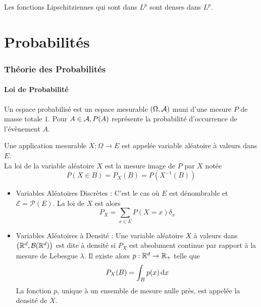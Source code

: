 \documentclass{cours}
\begin{document}
        \begin{lemma}
            Les fonctions Lipschitziennes qui sont dans $L^{p}$ sont denses dans $L^{p}$.
        \end{lemma}





\part{Probabilités}
    \section{Théorie des Probabilités}
    \subsection{Loi de Probabilité}
    \begin{definition}
        Un espace probabilisé est un espace mesurable $\left(\Omega, \mathcal{A}\right)$ muni d'une mesure $P$ de masse totale $1$. Pour $A\in \mathcal{A}, P(A)$ représente la probabilité d'occurrence de l'évènement $A$. 
    \end{definition}

    \begin{definition}
        Une application mesurable $X : \Omega \rightarrow E$ est appelée variable aléatoire à valeurs dans $E$. \\
        La loi de la variable aléatoire $X$ est la mesure image de $P$ par $X$ notée
        \[
            P(X\in B) = P_{X}(B)= P\left(X^{-1}(B)\right)
        \]
    \end{definition}

    \begin{definition}
        \begin{itemize}
            \item Variables Aléatoires Discrètes : C'est le cas où $E$ est dénombrable et $\mathcal{E} = \mathcal{P}(E)$. La loi de $X$ est alors \[P_{X} = \sum_{x \in E}P(X = x)\delta_{x}\]
            \item Variables Aléatoires à Densité : Une variable aléatoire $X$ à valeurs dans $\left(\mathbb{R}^{d}, \mathcal{B}(\mathbb{R}^{d})\right)$ est dite à densité si $P_{X}$ est absolument continue par rapport à la mesure de Lebesgue $\lambda$. Il existe alors $p : \mathbb{R}^{d} \rightarrow \mathbb{R}_{+}$ telle que \[P_{X}(B) = \int_{B}p(x){\rm \, d} x\] La fonction $p$, unique à un ensemble de mesure nulle près, est appelée la densité de $X$.
        \end{itemize}
    \end{definition}
\end{document}
